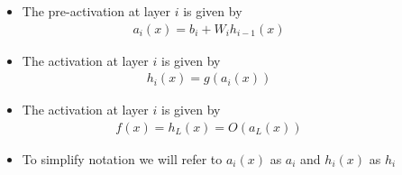 \begin{frame}
  \begin{columns}
    \begin{overlayarea}{\textwidth}{\textheight}
      \makebox[\textwidth][c]{\usebox{\nncontent}}
    \end{overlayarea}

    \begin{overlayarea}{\textwidth}{\textheight}
      \begin{itemize}
        \justifying
        \item<1-> The pre-activation at layer $i$ is given by
          \begin{align*}
            a_i(x) = b_i + W_i h_{i-1}(x)
          \end{align*}
        \item<2-> The activation at layer $i$ is given by
          \begin{align*}
            h_i(x) = g(a_i(x))
          \end{align*}

        \item<4-> The activation at layer $i$ is given by
            \begin{align*}
              f(x) = h_{L}(x) = O(a_{L}(x))
            \end{align*}
        \item<6-> To simplify notation we will refer to $a_i(x)$ as $a_i$ and $h_i(x)$ as $h_i$
      \end{itemize}
    \end{overlayarea}
  \end{columns}
\end{frame}

